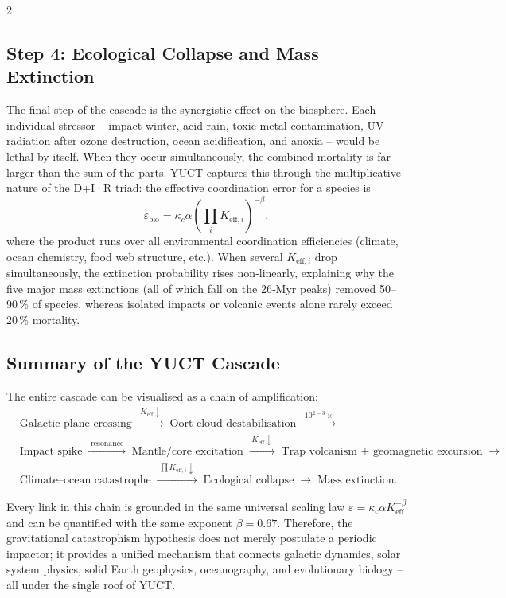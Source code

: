 \documentclass[11pt,a4paper]{article}
\begin{document}
\begin{multicols}{2}
		\subsection{Step 4: Ecological Collapse and Mass Extinction}
		
		The final step of the cascade is the synergistic effect on the biosphere. 
		Each individual stressor – impact winter, acid rain, toxic metal 
		contamination, UV radiation after ozone destruction, ocean acidification, 
		and anoxia – would be lethal by itself. When they occur simultaneously, 
		the combined mortality is far larger than the sum of the parts. 
		YUCT captures this through the multiplicative nature of the D+I·R triad: 
		the effective coordination error for a species is
		\[
		\varepsilon_{\text{bio}} = \kappa_c \alpha \left( \prod_{i} K_{\mathrm{eff},i} \right)^{-\beta},
		\]
		where the product runs over all environmental coordination efficiencies 
		(climate, ocean chemistry, food web structure, etc.). When several 
		\(K_{\mathrm{eff},i}\) drop simultaneously, the extinction probability 
		rises non‑linearly, explaining why the five major mass extinctions 
		(all of which fall on the 26‑Myr peaks) removed 50–90 \% of species, 
		whereas isolated impacts or volcanic events alone rarely exceed 20 \% 
		mortality.
		
	\end{multicols}
	
	\subsection{Summary of the YUCT Cascade}
	
	The entire cascade can be visualised as a chain of amplification:
	{\small
		\[
		\begin{aligned}
			&\text{Galactic plane crossing}
			\;\xrightarrow{\;K_{\mathrm{eff}}\downarrow\;}\;
			\text{Oort cloud destabilisation}
			\;\xrightarrow{\;10^{2-3}\times\;}\\
			&\text{Impact spike}
			\;\xrightarrow{\;\text{resonance}\;}\;
			\text{Mantle/core excitation}
			\;\xrightarrow{\;K_{\mathrm{eff}}\downarrow\;}\;
			\text{Trap volcanism + geomagnetic excursion}
			\;\xrightarrow{\;}\\
			&\text{Climate–ocean catastrophe}
			\;\xrightarrow{\;\prod K_{\mathrm{eff},i}\downarrow\;}\;
			\text{Ecological collapse}
			\;\xrightarrow{\;}\;
			\text{Mass extinction}.
		\end{aligned}
		\]
	}
	
	Every link in this chain is grounded in the same universal scaling law 
	\(\varepsilon = \kappa_c \alpha K_{\mathrm{eff}}^{-\beta}\) and can be 
	quantified with the same exponent \(\beta = 0.67\). Therefore, the 
	gravitational catastrophism hypothesis does not merely postulate a 
	periodic impactor; it provides a unified mechanism that connects 
	galactic dynamics, solar system physics, solid Earth geophysics, 
	oceanography, and evolutionary biology – all under the single roof 
	of YUCT.
	
\end{document}
